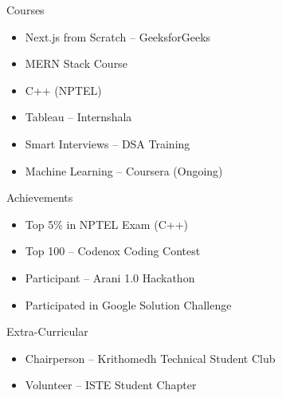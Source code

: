 \documentclass{resume}
\begin{document}
\begin{rSection}{Courses}

\begin{itemize}
\item Next.js from Scratch – GeeksforGeeks
\item MERN Stack Course
\item C++ (NPTEL)
\item Tableau – Internshala
\item Smart Interviews – DSA Training
\item Machine Learning – Coursera (Ongoing)
\end{itemize}

\end{rSection}

\begin{rSection}{Achievements}

\begin{itemize}
\item Top 5\% in NPTEL Exam (C++)
\item Top 100 – Codenox Coding Contest
\item Participant – Arani 1.0 Hackathon
\item Participated in Google Solution Challenge
\end{itemize}

\end{rSection}

\begin{rSection}{Extra-Curricular}

\begin{itemize}
\item Chairperson – Krithomedh Technical Student Club
\item Volunteer – ISTE Student Chapter
\end{itemize}

\end{rSection}
\end{document}
